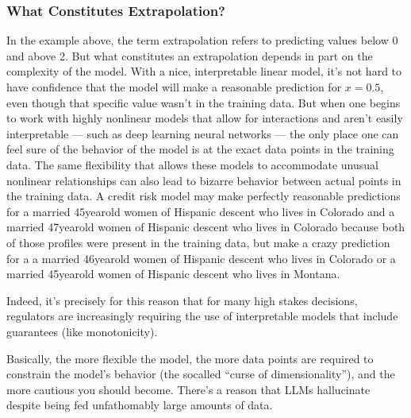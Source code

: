 \documentclass[letterpaper,10pt,english]{jupyterBook}
\begin{document}
\subsubsection{What Constitutes Extrapolation?}
\label{\detokenize{30_questions/24_passive_prediction_external:what-constitutes-extrapolation}}
\sphinxAtStartPar
In the example above, the term extrapolation refers to predicting values below 0 and above 2. But what constitutes an extrapolation depends in part on the complexity of the model. With a nice, interpretable linear model, it’s not hard to have confidence that the model will make a reasonable prediction for \(x=0.5\), even though that specific value wasn’t in the training data. But when one begins to work with highly non\sphinxhyphen{}linear models that allow for interactions and aren’t easily interpretable — such as deep learning neural networks — the only place one can feel sure of the behavior of the model is at the exact data points in the training data. The same flexibility that allows these models to accommodate unusual non\sphinxhyphen{}linear relationships can also lead to bizarre behavior between actual points in the training data. A credit risk model may make perfectly reasonable predictions for a married 45\sphinxhyphen{}year\sphinxhyphen{}old women of Hispanic descent who lives in Colorado and a married 47\sphinxhyphen{}year\sphinxhyphen{}old women of Hispanic descent who lives in Colorado because both of those profiles were present in the training data, but make a crazy prediction for a a married 46\sphinxhyphen{}year\sphinxhyphen{}old women of Hispanic descent who lives in Colorado or a married 45\sphinxhyphen{}year\sphinxhyphen{}old women of Hispanic descent who lives in Montana.

\sphinxAtStartPar
Indeed, it’s precisely for this reason that for many high stakes decisions, regulators are increasingly requiring the use of interpretable models that include guarantees (like monotonicity).

\sphinxAtStartPar
Basically, the more flexible the model, the more data points are required to constrain the model’s behavior (the so\sphinxhyphen{}called “curse of dimensionality”), and the more cautious you should become. There’s a reason that LLMs hallucinate despite being fed unfathomably large amounts of data.
\end{document}
